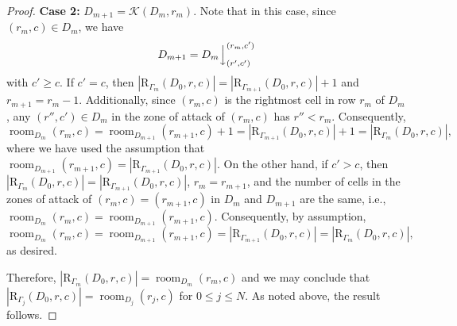 \documentclass[letterpaper,10pt]{article}
\newcommand{\ldownarrow}{\Big\downarrow}
\DeclareMathOperator{\room}{room}
\DeclareMathOperator{\blockers}{blockers}
\begin{document}
\begin{proof}
\noindent
\textbf{Case 2:} $D_{m+1}=\mathcal{K}(D_m,r_m)$. Note that in this case, since $(r_m,c)\in D_m$, we have $$D_{m+1}=D_m\ldownarrow^{(r_m,c')}_{(r',c')}$$ with $c'\ge c$. If $c'=c$, then $|\mathrm{R}_{\Gamma_m}(D_0,r, c)|=|\mathrm{R}_{\Gamma_{m+1}}(D_0,r, c)|+1$ and $r_{m+1}=r_m-1$. Additionally, since $(r_m,c)$ is the rightmost cell in row $r_m$ of $D_m$, any $(r'', c') \in D_m$ in the zone of attack of $(r_m,c)$ has $r'' < r_m$. Consequently, $$\room_{D_m}(r_m, c)=\room_{D_{m+1}}(r_{m+1}, c)+1=|\mathrm{R}_{\Gamma_{m+1}}(D_0,r, c)|+1=|\mathrm{R}_{\Gamma_m}(D_0,r, c)|,$$ where we have used the assumption that $\room_{D_{m+1}}(r_{m+1}, c)=|\mathrm{R}_{\Gamma_{m+1}}(D_0,r, c)|$. On the other hand, if $c'>c$, then $|\mathrm{R}_{\Gamma_m}(D_0,r, c)|=|\mathrm{R}_{\Gamma_{m+1}}(D_0,r, c)|$, $r_m=r_{m+1}$, and the number of cells in the zones of attack of $(r_m,c)=(r_{m+1},c)$ in $D_m$ and $D_{m+1}$ are the same, i.e., $\room_{D_m}(r_m, c)=\room_{D_{m+1}}(r_{m+1}, c)$. Consequently, by assumption, $$\room_{D_m}(r_m, c)=\room_{D_{m+1}}(r_{m+1}, c)=|\mathrm{R}_{\Gamma_{m+1}}(D_0,r, c)|=|\mathrm{R}_{\Gamma_m}(D_0,r, c)|,$$ as desired.
\bigskip

\noindent
Therefore, $|\mathrm{R}_{\Gamma_m}(D_0,r, c)| = \room_{D_m}(r_m, c)$ and we may conclude that $|\mathrm{R}_{\Gamma_j}(D_0,r, c)| = \room_{D_j}(r_j, c)$ for $0\le j\le N$. As noted above, the result follows.
\end{proof}


\end{document}
